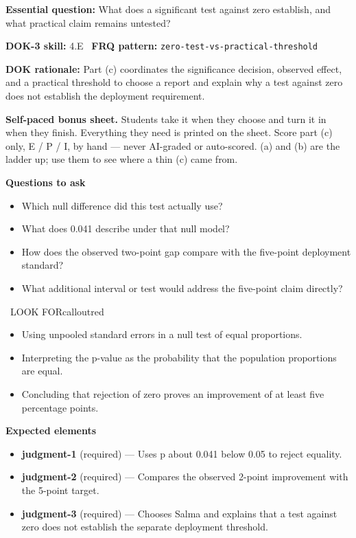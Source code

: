 \documentclass[11pt]{article}
\begin{document}
\textbf{Essential question:} What does a significant test against zero establish, and what practical claim remains untested?\par
\textbf{DOK-3 skill:} 4.E \textperiodcentered\ \textbf{FRQ pattern:} {\small\texttt{zero-\allowbreak{}test-\allowbreak{}vs-\allowbreak{}practical-\allowbreak{}threshold}}\par
\textbf{DOK rationale:} Part (c) coordinates the significance decision, observed effect, and a practical threshold to choose a report and explain why a test against zero does not establish the deployment requirement.\par

\textbf{Self-paced bonus sheet.} Students take it when they choose and turn it in when they finish. Everything they need is printed on the sheet. Score part (c) only, E / P / I, by hand --- never AI-graded or auto-scored. (a) and (b) are the ladder up; use them to see where a thin (c) came from.\par

\textbf{Questions to ask}
\begin{itemize}[leftmargin=1.5em,itemsep=2pt,topsep=2pt]
  \item Which null difference did this test actually use?
  \item What does 0.041 describe under that null model?
  \item How does the observed two-point gap compare with the five-point deployment standard?
  \item What additional interval or test would address the five-point claim directly?
\end{itemize}

\begin{callout}{\IconWarn\ LOOK FOR}{calloutred}
\begin{itemize}[leftmargin=1.5em,itemsep=2pt,topsep=2pt]
  \item Using unpooled standard errors in a null test of equal proportions.
  \item Interpreting the p-value as the probability that the population proportions are equal.
  \item Concluding that rejection of zero proves an improvement of at least five percentage points.
\end{itemize}
\end{callout}


\textbf{Expected elements}
\begin{itemize}[leftmargin=1.5em,itemsep=2pt,topsep=2pt]
  \item \textbf{judgment-1} (required) --- Uses p about 0.041 below 0.05 to reject equality.
  \item \textbf{judgment-2} (required) --- Compares the observed 2-point improvement with the 5-point target.
  \item \textbf{judgment-3} (required) --- Chooses Salma and explains that a test against zero does not establish the separate deployment threshold.
\end{itemize}
\end{document}
